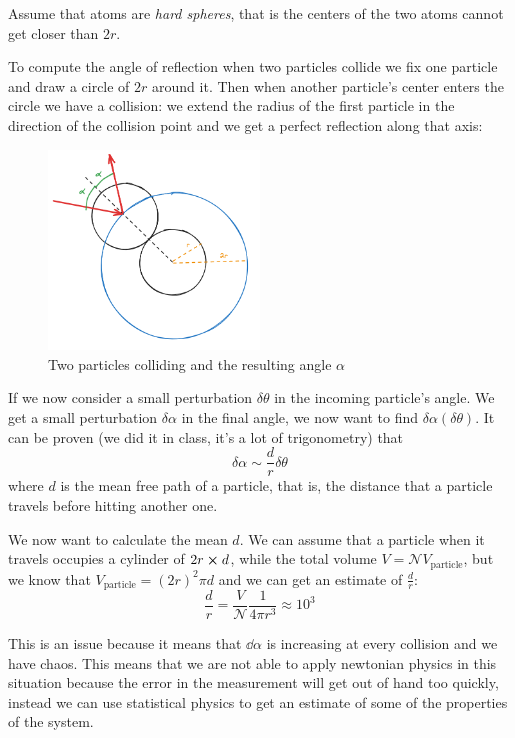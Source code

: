\documentclass[14pt]{extarticle}
\begin{document}
Assume that atoms are \emph{hard spheres}, that is the centers of the two atoms cannot get closer than $2r$.

To compute the angle of reflection when two particles collide we fix one particle and draw a circle of $2r$ around it.
Then when another particle's center enters the circle we have a collision: we extend the radius of the first particle in the direction of the collision point and we get a perfect reflection along that axis:

\begin{figure}[H]
    \centering
    \includegraphics[width=0.5\textwidth]{assets/S2_P2_PHY1/particle_collision.png}
    \caption{Two particles colliding and the resulting angle $\alpha$}
\end{figure}

If we now consider a small perturbation $\delta \theta$ in the incoming particle's angle.
We get a small perturbation $\delta \alpha$ in the final angle, we now want to find $\delta \alpha(\delta \theta)$.
It can be proven (we did it in class, it's a lot of trigonometry) that
\begin{equation}
    \delta \alpha \sim \frac{d}{r} \delta \theta
\end{equation}
where $d$ is the mean free path of a particle, that is, the distance that a particle travels before hitting another one.

We now want to calculate the mean $d$.
We can assume that a particle when it travels occupies a cylinder of $2r \cross d$, while the total volume $V = \mathscr{N} V_\text{particle}$, but we know that $V_\text{particle} = (2r)^2 \pi d$ and we can get an estimate of $\frac{d}{r}$:
\begin{equation}
    \frac{d}{r} = \frac{V}{\mathscr{N}} \frac{1}{4 \pi r^3} \approx 10^3
\end{equation}

This is an issue because it means that $\dd{\alpha}$ is increasing at every collision and we have chaos.
This means that we are not able to apply newtonian physics in this situation because the error in the measurement will get out of hand too quickly,
instead we can use statistical physics to get an estimate of some of the properties of the system.
\end{document}
